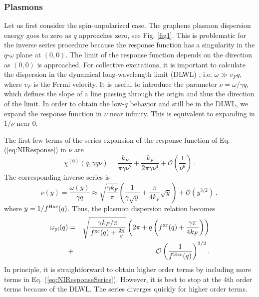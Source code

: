 \documentclass[aps,prb,twocolumn,superscriptaddress]{revtex4-2}
\newcommand{\bigO}{\mathcal{O}}
\newcommand{\kf}{k_F}
\newcommand{\w}{\omega}
\begin{document}
\subsubsection{Plasmons}

Let us first consider the spin-unpolarized case.
The graphene plasmon dispersion energy goes to zero as $q$ approaches zero, see Fig. \ref{fig1}.
This is problematic for the inverse series procedure because the response function has a singularity in the $q$-$\w$ plane at $(0,0)$.
The limit of the response function depends on the direction as $(0,0)$ is approached.
For collective excitations, it is important to calculate the dispersion in the dynamical long-wavelength limit (DLWL) \cite{GiulianiVignale}, i.e. $\w \gg v_F q$,
where $v_F$ is the Fermi velocity. It is useful to introduce the parameter
$\nu = \w/\gamma q$, which defines the slope of a line passing through the origin and thus the direction of the limit.
In order to obtain the low-$q$ behavior and still be in the DLWL, we expand the response function in $\nu$ near infinity.
This is equivalent to expanding in $1/\nu$ near 0.


The first few terms of the series expansion of the response function of Eq. (\ref{eq:NIResponse}) in $\nu$ are
\begin{equation}
  \chi^{(0)}(q,\gamma q \nu) =
  \frac{ \kf}{ \pi  \gamma  \nu^2}
  +\frac{ \kf}{2 \pi  \gamma  \nu^4}
  +\bigO\left(\frac{1}{\nu^6}\right) \: .
  \label{eq:NIResponseSeries}
\end{equation}
The corresponding inverse series is
\begin{equation}
  \nu (y) = \frac{\w(y)}{\gamma q} \approx
  \sqrt{\frac{\gamma \kf}{\pi }} \left(
  \frac{1}{\gamma \sqrt{y}}
  +
  \frac{\pi}{4 \kf} \sqrt{y}
  \right)
  +\bigO\left(y^{3/2}\right) \: ,
\end{equation}
where $y=1/f^{\rm Hxc}(q)$. Thus, the plasmon dispersion relation becomes
\begin{eqnarray}
  \w_{\text{pl}}(q) &=&
  \sqrt{\frac{\gamma \kf /\pi}{f^{\rm xc}(q)+\frac{2 \pi}{q} }}
  \left( 2 \pi  + q\left( f^{\rm xc}(q)+\frac{\gamma\pi}{4\kf}  \right)\right) \nonumber\\
  &+&
  \bigO\left(\frac{1}{f^{\rm Hxc}(q)}\right)^{3/2} .
\end{eqnarray}
In principle, it is straightforward to obtain higher order terms by including more terms in Eq. (\ref{eq:NIResponseSeries}).
However, it is best to stop at the 4th order terms because of the DLWL.
The series diverges quickly for higher order terms.
\end{document}
